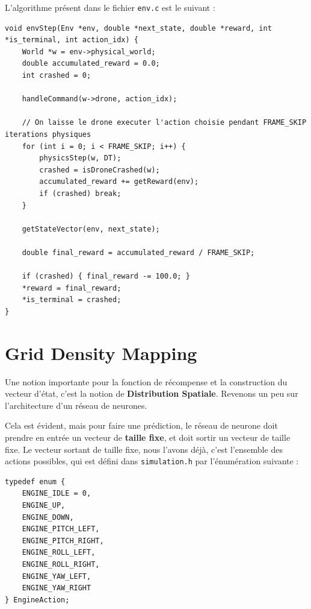 \documentclass{article}
\begin{document}
\vspace{0.5cm}

L'algorithme présent dans le fichier \texttt{env.c} est le suivant :

\begin{lstlisting}[style=CStyle]
void envStep(Env *env, double *next_state, double *reward, int *is_terminal, int action_idx) {
    World *w = env->physical_world;
    double accumulated_reward = 0.0;
    int crashed = 0;

    handleCommand(w->drone, action_idx);

    // On laisse le drone executer l'action choisie pendant FRAME_SKIP iterations physiques
    for (int i = 0; i < FRAME_SKIP; i++) {
        physicsStep(w, DT);
        crashed = isDroneCrashed(w);
        accumulated_reward += getReward(env);
        if (crashed) break;
    }

    getStateVector(env, next_state);

    double final_reward = accumulated_reward / FRAME_SKIP; 

    if (crashed) { final_reward -= 100.0; }
    *reward = final_reward; 
    *is_terminal = crashed;
}
\end{lstlisting}


\section{Grid Density Mapping}

Une notion importante pour la fonction de récompense et la construction du vecteur d'état, 
c'est la notion de \textbf{Distribution Spatiale}. Revenons un peu sur l'architecture d'un réseau de neurones.

Cela est évident, mais pour faire une prédiction, le réseau de neurone doit prendre en entrée un vecteur 
de \textbf{taille fixe}, et doit sortir un vecteur de taille fixe.
Le vecteur sortant de taille fixe, nous l'avons déjà, c'est l'ensemble des actions possibles, qui est défini dans \texttt{simulation.h} par l'énumération suivante :

\begin{lstlisting}[style=CStyle]
 typedef enum {
    ENGINE_IDLE = 0,
    ENGINE_UP,
    ENGINE_DOWN,
    ENGINE_PITCH_LEFT,
    ENGINE_PITCH_RIGHT,
    ENGINE_ROLL_LEFT,
    ENGINE_ROLL_RIGHT,
    ENGINE_YAW_LEFT,
    ENGINE_YAW_RIGHT
} EngineAction;
\end{lstlisting}

\vspace{0.5cm}
\end{document}
